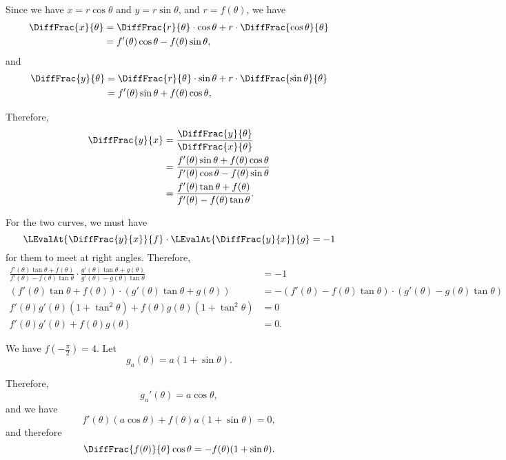 \Question{\currfilebase}

Since we have \(x = r \cos \theta\) and \(y = r \sin \theta\), and \(r = f(\theta)\), we have
\begin{align*}
    \DiffFrac{x}{\theta} &= \DiffFrac{r}{\theta} \cdot \cos \theta + r \cdot \DiffFrac{\cos \theta}{\theta}\\
    &= f'(\theta) \cos \theta - f(\theta) \sin \theta,
\end{align*}
and
\begin{align*}
    \DiffFrac{y}{\theta} &= \DiffFrac{r}{\theta} \cdot \sin \theta + r \cdot \DiffFrac{\sin \theta}{\theta}\\
    &= f'(\theta) \sin \theta + f(\theta) \cos \theta,
\end{align*}

Therefore,
\begin{align*}
    \DiffFrac{y}{x} &= \frac{\DiffFrac{y}{\theta}}{\DiffFrac{x}{\theta}}\\
    &= \frac{f'(\theta) \sin \theta + f(\theta) \cos \theta}{f'(\theta) \cos \theta - f(\theta) \sin \theta}\\
    &= \frac{f'(\theta) \tan \theta + f(\theta)}{f'(\theta) - f(\theta) \tan \theta}.
\end{align*}

For the two curves, we must have
\[
    \LEvalAt{\DiffFrac{y}{x}}{f} \cdot \LEvalAt{\DiffFrac{y}{x}}{g} = -1
\]
for them to meet at right angles. Therefore,
\begin{align*}
    \frac{f'(\theta) \tan \theta + f(\theta)}{f'(\theta) - f(\theta) \tan \theta} \cdot
    \frac{g'(\theta) \tan \theta + g(\theta)}{g'(\theta) - g(\theta) \tan \theta} &= -1\\
    \left(f'(\theta) \tan \theta + f(\theta)\right) \cdot \left(g'(\theta) \tan \theta + g(\theta)\right) &= -\left(f'(\theta) - f(\theta) \tan \theta\right) \cdot \left(g'(\theta) - g(\theta) \tan \theta\right)\\
    f'(\theta) g'(\theta) (1 + \tan^2\theta) + f(\theta) g(\theta) (1 + \tan^2\theta) &= 0\\
    f'(\theta) g'(\theta) + f(\theta) g(\theta) &= 0.
\end{align*}

We have \(f\left(-\frac{\pi}{2}\right) = 4\). Let
\[
    g_a(\theta) = a(1 + \sin \theta).
\]

Therefore,
\[
    g_a'(\theta) = a \cos \theta,
\]
and we have
\[
    f'(\theta) (a \cos \theta) + f(\theta) a (1 + \sin \theta) = 0,
\]
and therefore
\[
    \DiffFrac{f(\theta)}{\theta} \cos \theta = - f(\theta) (1 + \sin \theta).
\]

